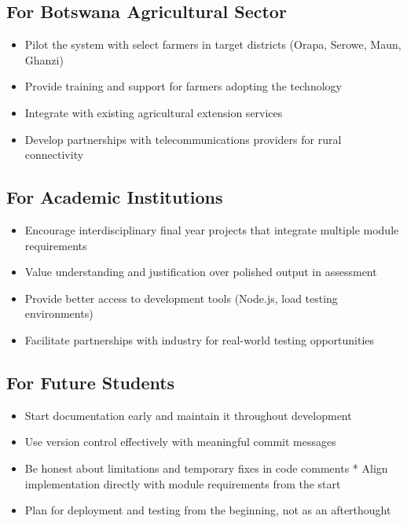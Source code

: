 \subsection{For Botswana Agricultural Sector}

\begin{itemize}
    \item Pilot the system with select farmers in target districts (Orapa, Serowe, Maun, Ghanzi)
    \item Provide training and support for farmers adopting the technology
    \item Integrate with existing agricultural extension services
    \item Develop partnerships with telecommunications providers for rural connectivity
\end{itemize}

\subsection{For Academic Institutions}

\begin{itemize}
    \item Encourage interdisciplinary final year projects that integrate multiple module requirements
    \item Value understanding and justification over polished output in assessment
    \item Provide better access to development tools (Node.js, load testing environments)
    \item Facilitate partnerships with industry for real-world testing opportunities
\end{itemize}

\subsection{For Future Students}

\begin{itemize}
    \item Start documentation early and maintain it throughout development
    \item Use version control effectively with meaningful commit messages
    \item Be honest about limitations and temporary fixes in code comments
    * Align implementation directly with module requirements from the start
    \item Plan for deployment and testing from the beginning, not as an afterthought
\end{itemize}

